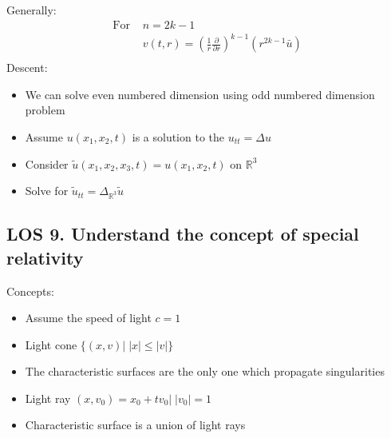 \documentclass[12pt, a4paper]{article}
\begin{document}
Generally:
\begin{align*}
    \text{For }&n=2k-1\\
    &v(t, r)=\left(\frac{1}{r}\frac{\partial}{\partial r}\right)^{k-1}(r^{2k-1}\bar{u})\\
\end{align*}
Descent: 
\begin{itemize}
    \item We can solve even numbered dimension using odd numbered dimension problem
    \item Assume $u(x_1, x_2, t)$ is a solution to the $u_{tt}=\Delta u$
    \item Consider $\tilde{u}(x_1, x_2, x_3, t) = u(x_1, x_2, t)$ on $\mathbb{R}^3$
    \item Solve for $\tilde{u}_{tt} = \Delta_{\mathbb{R}^3} \tilde{u}$
\end{itemize}
\vspace{0.3em}

\subsection*{LOS 9. Understand the concept of special relativity}
Concepts:
\begin{itemize}
    \item Assume the speed of light $c=1$
    \item Light cone $\{(x, v) |\; |x| \leq |v|\}$
    \item The characteristic surfaces are the only one which propagate singularities
    \item Light ray $(x, v_0)={x_0+tv_0|\;|v_0|=1}$
    \item Characteristic surface is a union of light rays\\
\end{itemize}

\vspace{0.3em}
\end{document}
